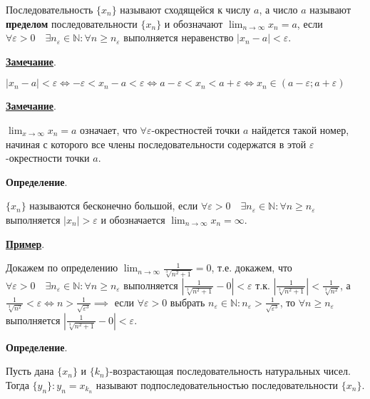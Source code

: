 \documentclass{article}
\newcommand{\parspace}{\vspace{10pt}}
\begin{document}
Последовательность $\{x_n\}$ называют сходящейся к числу $a$, а число $a$ называют
\textbf{пределом} последовательности $\{x_n\}$ и обозначают 
$\displaystyle\lim_{n \rightarrow \infty} x_n = a$, если 
$\forall \varepsilon > 0 \quad \exists n_\varepsilon \in \mathbb{N}: \forall n \ge n_\varepsilon$
выполняется неравенство $|x_n - a| < \varepsilon$.

\parspace

\underline{\textbf{Замечание}}.

$|x_n - a| < \varepsilon \Leftrightarrow -\varepsilon < x_n - a < \varepsilon 
\Leftrightarrow a - \varepsilon < x_n < a + \varepsilon
\Leftrightarrow x_n \in (a - \varepsilon; a + \varepsilon)$

\parspace

\underline{\textbf{Замечание}}.

$\displaystyle\lim_{x \rightarrow \infty} x_n = a$ означает, что
$\forall \varepsilon$-окрестностей точки $a$ найдется такой номер, 
начиная с которого все члены последовательности содержатся в этой
$\varepsilon$-окрестности точки $a$.

\parspace

\textbf{Определение}.

$\{x_n\}$ называются бесконечно большой, если
$\forall \varepsilon > 0 \quad \exists n_\varepsilon \in \mathbb{N}:
\forall n \ge n_\varepsilon$ выполняется $|x_n| > \varepsilon$ и
обозначается $\displaystyle\lim_{n \to \infty} x_n = \infty$.

\parspace

\underline{\textbf{Пример}}.

Докажем по определению 
$\displaystyle\lim_{n \to \infty} \frac{1}{\sqrt[3]{n^2 + 1}} = 0$,
т.е. докажем, что $\forall \varepsilon > 0 \quad \exists n_\varepsilon \in \mathbb{N}:
\forall n \ge n_\varepsilon$ выполняется $\left|\frac{1}{\sqrt[3]{n^2 + 1}} - 0\right| < \varepsilon$
т.к. $\left|\frac{1}{\sqrt[3]{n^2 + 1}}\right| < \frac{1}{\sqrt[3]{n^2}}$,
а $\frac{1}{\sqrt[3]{n^2}} < \varepsilon \Leftrightarrow n > \frac{1}{\sqrt{\varepsilon^3}}
\implies$ если $\forall \varepsilon > 0$ выбрать 
$n_\varepsilon \in \mathbb{N}: n_\varepsilon > \frac{1}{\sqrt{\varepsilon^3}}$,
то $\forall n \ge n_\varepsilon$ выполняется $\left|\frac{1}{\sqrt[3]{n^2 + 1}} - 0\right| < \varepsilon$.

\parspace

\textbf{Определение}.

Пусть дана $\{x_n\}$ и $\{k_n\}$-возрастающая последовательность натуральных чисел.
Тогда $\{y_n\}: y_n = x_{k_n}$ называют подпоследовательностью последовательности $\{x_n\}$.
\end{document}
